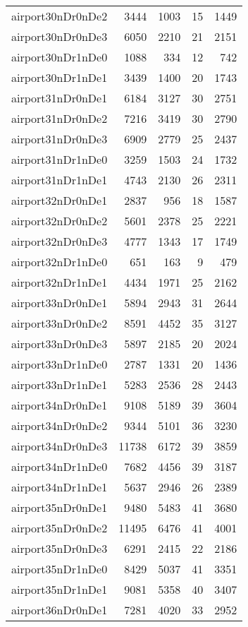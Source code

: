\documentclass[../../../thesis.tex]{subfiles}
\begin{document}
\begin{longtable}{lrrrr}
airport30nDr0nDe2 & 3444 & 1003 & 15 & 1449 \\
airport30nDr0nDe3 & 6050 & 2210 & 21 & 2151 \\
airport30nDr1nDe0 & 1088 & 334 & 12 & 742 \\
airport30nDr1nDe1 & 3439 & 1400 & 20 & 1743 \\
airport31nDr0nDe1 & 6184 & 3127 & 30 & 2751 \\
airport31nDr0nDe2 & 7216 & 3419 & 30 & 2790 \\
airport31nDr0nDe3 & 6909 & 2779 & 25 & 2437 \\
airport31nDr1nDe0 & 3259 & 1503 & 24 & 1732 \\
airport31nDr1nDe1 & 4743 & 2130 & 26 & 2311 \\
airport32nDr0nDe1 & 2837 & 956 & 18 & 1587 \\
airport32nDr0nDe2 & 5601 & 2378 & 25 & 2221 \\
airport32nDr0nDe3 & 4777 & 1343 & 17 & 1749 \\
airport32nDr1nDe0 & 651 & 163 & 9 & 479 \\
airport32nDr1nDe1 & 4434 & 1971 & 25 & 2162 \\
airport33nDr0nDe1 & 5894 & 2943 & 31 & 2644 \\
airport33nDr0nDe2 & 8591 & 4452 & 35 & 3127 \\
airport33nDr0nDe3 & 5897 & 2185 & 20 & 2024 \\
airport33nDr1nDe0 & 2787 & 1331 & 20 & 1436 \\
airport33nDr1nDe1 & 5283 & 2536 & 28 & 2443 \\
airport34nDr0nDe1 & 9108 & 5189 & 39 & 3604 \\
airport34nDr0nDe2 & 9344 & 5101 & 36 & 3230 \\
airport34nDr0nDe3 & 11738 & 6172 & 39 & 3859 \\
airport34nDr1nDe0 & 7682 & 4456 & 39 & 3187 \\
airport34nDr1nDe1 & 5637 & 2946 & 26 & 2389 \\
airport35nDr0nDe1 & 9480 & 5483 & 41 & 3680 \\
airport35nDr0nDe2 & 11495 & 6476 & 41 & 4001 \\
airport35nDr0nDe3 & 6291 & 2415 & 22 & 2186 \\
airport35nDr1nDe0 & 8429 & 5037 & 41 & 3351 \\
airport35nDr1nDe1 & 9081 & 5358 & 40 & 3407 \\
airport36nDr0nDe1 & 7281 & 4020 & 33 & 2952 \\

\end{longtable}
\end{document}
